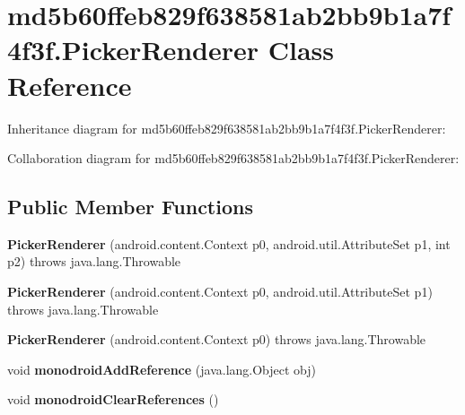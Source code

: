 \hypertarget{classmd5b60ffeb829f638581ab2bb9b1a7f4f3f_1_1_picker_renderer}{}\section{md5b60ffeb829f638581ab2bb9b1a7f4f3f.\+Picker\+Renderer Class Reference}
\label{classmd5b60ffeb829f638581ab2bb9b1a7f4f3f_1_1_picker_renderer}


Inheritance diagram for md5b60ffeb829f638581ab2bb9b1a7f4f3f.\+Picker\+Renderer\+:


Collaboration diagram for md5b60ffeb829f638581ab2bb9b1a7f4f3f.\+Picker\+Renderer\+:
\subsection*{Public Member Functions}
\begin{DoxyCompactItemize}
\item 
\mbox{\label{classmd5b60ffeb829f638581ab2bb9b1a7f4f3f_1_1_picker_renderer_a461011fae58fd61c16bddd9354a0e2ee}} 
{\bfseries Picker\+Renderer} (android.\+content.\+Context p0, android.\+util.\+Attribute\+Set p1, int p2)  throws java.\+lang.\+Throwable 	
\item 
\mbox{\label{classmd5b60ffeb829f638581ab2bb9b1a7f4f3f_1_1_picker_renderer_a9fd2bcb1d380420ff920cacf999ff555}} 
{\bfseries Picker\+Renderer} (android.\+content.\+Context p0, android.\+util.\+Attribute\+Set p1)  throws java.\+lang.\+Throwable 	
\item 
\mbox{\label{classmd5b60ffeb829f638581ab2bb9b1a7f4f3f_1_1_picker_renderer_a9880f6ec6bfd5158d950ca6e6f6a9bf9}} 
{\bfseries Picker\+Renderer} (android.\+content.\+Context p0)  throws java.\+lang.\+Throwable 	
\item 
\mbox{\label{classmd5b60ffeb829f638581ab2bb9b1a7f4f3f_1_1_picker_renderer_ac220cbf2703931a21301fff234bdcd51}} 
void {\bfseries monodroid\+Add\+Reference} (java.\+lang.\+Object obj)
\item 
\mbox{\label{classmd5b60ffeb829f638581ab2bb9b1a7f4f3f_1_1_picker_renderer_a1da45f3e35fc65d101c94408a81964f7}} 
void {\bfseries monodroid\+Clear\+References} ()
\end{DoxyCompactItemize}
